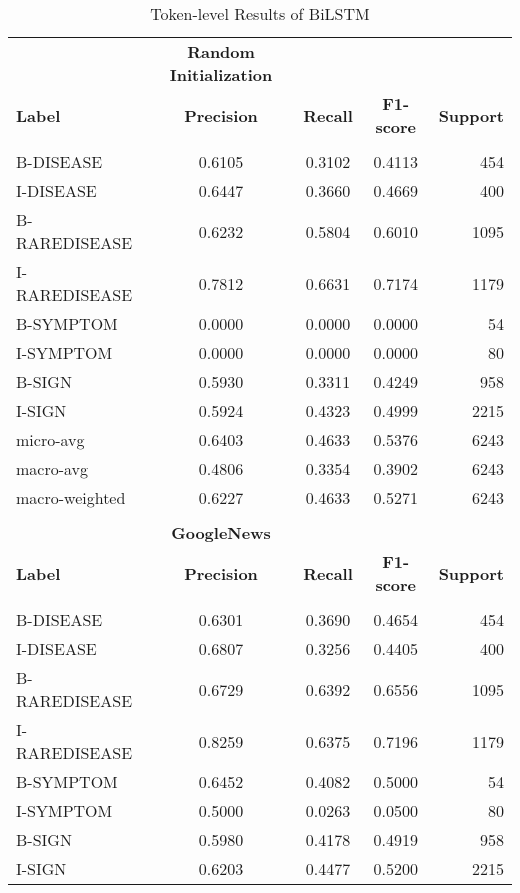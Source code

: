 \documentclass[preprint,12pt]{elsarticle}
\begin{document}
\begin{table}[H]
\centering
\tiny
\caption{\label{tab:tokenBiLSTM}Token-level Results of BiLSTM}
\begin{tabular}{lcccr}
\\
& \multicolumn{1}{c}{\textbf{Random Initialization}} \\
{\bf Label} & {\bf Precision} &
{\bf Recall} &
{\bf F1-score} & {\bf Support} \\
\hline\\[-8pt]
B-DISEASE	&	0.6105	&	0.3102	&	0.4113	&	454\\
I-DISEASE	&	0.6447	&	0.3660	&	0.4669	&	400\\
B-RAREDISEASE	&	0.6232	&	0.5804	&	0.6010	&	1095\\
I-RAREDISEASE	&	0.7812	&	0.6631	&	0.7174	&	1179\\
B-SYMPTOM	&	0.0000	&	0.0000	&	0.0000	&	54\\I-SYMPTOM	&	0.0000	&	0.0000	&	0.0000	&	80\\B-SIGN	&	0.5930	&	0.3311	&	0.4249	&	958\\I-SIGN	&	0.5924	&	0.4323	&	0.4999	&	2215\\

micro-avg	&	0.6403	&	0.4633	&	0.5376	&	6243\\macro-avg	&	0.4806	&	0.3354	&	0.3902	&	6243\\
macro-weighted	&	0.6227	&	0.4633	&	0.5271	&	6243\\


\hline
\\
& \multicolumn{1}{c}{\textbf{GoogleNews}} \\
{\bf Label} & {\bf Precision} &
{\bf Recall} &
{\bf F1-score} & {\bf Support} \\
\hline\\[-8pt]

B-DISEASE	&	0.6301	&	0.3690	&	0.4654	&	454\\
I-DISEASE	&	0.6807	&	0.3256	&	0.4405	&	400\\
B-RAREDISEASE	&	0.6729	&	0.6392	&	0.6556	&	1095\\
I-RAREDISEASE	&	0.8259	&	0.6375	&	0.7196	&	1179\\
B-SYMPTOM	&	0.6452	&	0.4082	&	0.5000	&	54\\
I-SYMPTOM	&	0.5000	&	0.0263	&	0.0500	&	80\\
B-SIGN	&	0.5980	&	0.4178	&	0.4919	&	958\\
I-SIGN	&	0.6203	&	0.4477	&	0.5200	&	2215\\


\end{tabular}
\end{table}
\end{document}
